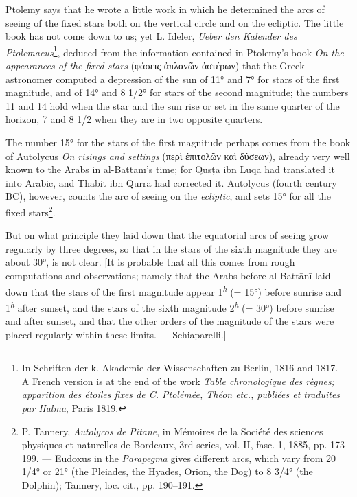 \documentclass[11pt]{article}
\newcommand{\Pg}[1]{\marginpar{\footnotesize\color{gray}#1}}
\begin{document}
\par Ptolemy says that he wrote a little work in which he determined the arcs of seeing of the fixed stars both on the vertical circle and on the ecliptic. The little book has not come down to us; yet L. Ideler, \emph{Ueber den Kalender des Ptolemaeus}\footnote{In Schriften der k. Akademie der Wissenschaften zu Berlin, 1816 and 1817. — A French version is at the end of the work \emph{Table chronologique des règnes; apparition des étoiles fixes de C. Ptolémée, Théon etc., publiées et traduites par Halma}, Paris 1819.}, deduced from the information contained in Ptolemy's book \emph{On the appearances of the fixed stars} ({\greekfont φάσεις ἀπλανῶν ἀστέρων}) that the Greek astronomer computed a depression of the sun of 11° and 7° for stars of the first magnitude, and of 14° and 8 1/2° for stars of the second magnitude; the numbers 11 and 14 hold when the star and the sun rise or set in the same quarter of the horizon, 7 and 8 1/2 when they are in two opposite quarters.\par
\par The number 15° for the stars of the first magnitude perhaps comes from the book of Autolycus \emph{On risings and settings} ({\greekfont περὶ ἐπιτολῶν καὶ δύσεων}), already very well known to the Arabs in al-Battānī's time; for Qusṭā ibn Lūqā had translated it into Arabic, and Thābit ibn Qurra had corrected it. Autolycus (fourth century BC), however, counts the arc of seeing on the \emph{ecliptic}, and sets 15° for all the fixed stars\footnote{P. Tannery, \emph{Autolycos de Pitane}, in Mémoires de la Société des sciences physiques et naturelles de Bordeaux, 3rd series, vol. II, fasc. 1, 1885, pp. 173–199. — Eudoxus in the \emph{Parapegma} gives different arcs, which vary from 20 1/4° or 21° (the Pleiades, the Hyades, Orion, the Dog) to 8 3/4° (the Dolphin); Tannery, loc. cit., pp. 190–191.}.\par
\par \Pg{I 286}But on what principle they laid down that the equatorial arcs of seeing grow regularly by three degrees, so that in the stars of the sixth magnitude they are about 30°, is not clear. [It is probable that all this comes from rough computations and observations; namely that the Arabs before al-Battānī laid down that the stars of the first magnitude appear 1\textsuperscript{\itshape h} (= 15°) before sunrise and 1\textsuperscript{\itshape h} after sunset, and the stars of the sixth magnitude 2\textsuperscript{\itshape h} (= 30°) before sunrise and after sunset, and that the other orders of the magnitude of the stars were placed regularly within these limits. — Schiaparelli.]\par
\end{document}

